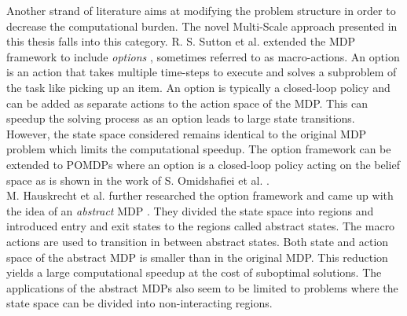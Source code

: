 Another strand of literature aims at modifying the problem structure in order to decrease the computational burden. The novel Multi-Scale approach presented in this thesis falls into this category. R. S. Sutton et al. extended the MDP framework to include \textit{options} \cite{SUTTON1999181}, sometimes referred to as macro-actions. An option is an action that takes multiple time-steps to execute and solves a subproblem of the task like picking up an item.  An option is typically a closed-loop policy and can be added as separate actions to the action space of the MDP. This can speedup the solving process as an option leads to large state transitions. However, the state space considered remains identical to the original MDP problem which limits the computational speedup. The option framework can be extended to POMDPs where an option is a closed-loop policy acting on the belief space as is shown in the work of S. Omidshafiei et al. \cite{7140035}.\\

M. Hauskrecht et al. further researched the option framework and came up with the idea of an \textit{abstract} MDP \cite{DBLP:journals/corr/abs-1301-7381}. They divided the state space into regions and introduced entry and exit states to the regions called abstract states. The macro actions are used to transition in between abstract states. Both state and action space of the abstract MDP is smaller than in the original MDP. This reduction yields a large computational speedup at the cost of suboptimal solutions. The applications of the abstract MDPs also seem to be limited to problems where the state space can be divided into non-interacting regions.\\

